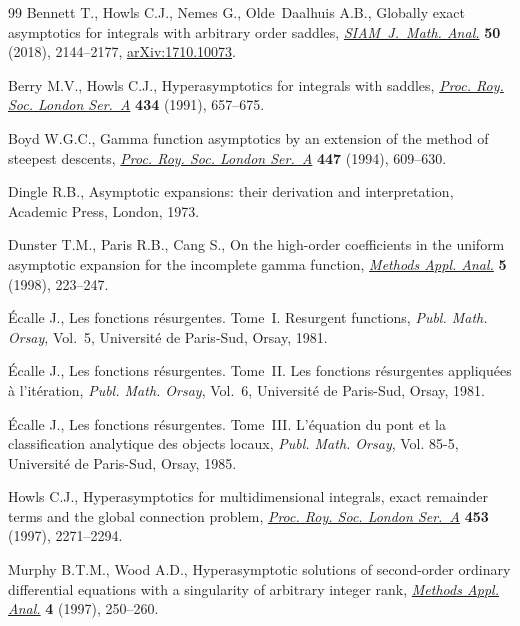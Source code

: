 \documentclass[11pt]{article}
\numberwithin{equation}{section}
\numberwithin{equation}{section}
\begin{document}
\begin{thebibliography}{99}
Bennett T., Howls C.J., Nemes G., Olde~Daalhuis A.B., Globally exact
 asymptotics for integrals with arbitrary order saddles, \href{https://doi.org/10.1137/17M1154217}{\textit{SIAM~J.~Math.
 Anal.}} \textbf{50} (2018), 2144--2177, \href{https://arxiv.org/abs/1710.10073}{arXiv:1710.10073}.

Berry M.V., Howls C.J., Hyperasymptotics for integrals with saddles,
  \href{https://doi.org/10.1098/rspa.1991.0119}{\textit{Proc. Roy. Soc. London Ser.~A}} \textbf{434} (1991), 657--675.

Boyd W.G.C., Gamma function asymptotics by an extension of the method of
 steepest descents, \href{https://doi.org/10.1098/rspa.1994.0158}{\textit{Proc. Roy. Soc. London Ser.~A}} \textbf{447}
 (1994), 609--630.

Dingle R.B., Asymptotic expansions: their derivation and interpretation,
 Academic Press, London, 1973.

Dunster T.M., Paris R.B., Cang S., On the high-order coefficients in the
 uniform asymptotic expansion for the incomplete gamma function,
  \href{https://doi.org/10.4310/MAA.1998.v5.n3.a1}{\textit{Methods Appl. Anal.}} \textbf{5} (1998), 223--247.

\'Ecalle J., Les fonctions r\'esurgentes. {T}ome~{I}. {R}esurgent functions,
 \textit{Publ. Math. Orsay}, Vol.~5, Universit\'e de Paris-Sud, Orsay, 1981.

\'Ecalle J., Les fonctions r\'esurgentes. {T}ome~{II}. {L}es fonctions
 r\'esurgentes appliqu\'ees \`a l'it\'eration, \textit{Publ. Math. Orsay},
 Vol.~6, Universit\'e de Paris-Sud, Orsay, 1981.

\'Ecalle J., Les fonctions r\'esurgentes. {T}ome~{III}. {L}'\'equation du pont
 et la classification analytique des objects locaux, \textit{Publ. Math.
 Orsay}, Vol. 85-5, Universit\'e de Paris-Sud, Orsay, 1985.

Howls C.J., Hyperasymptotics for multidimensional integrals, exact remainder
 terms and the global connection problem, \href{https://doi.org/10.1098/rspa.1997.0122}{\textit{Proc. Roy. Soc. London
 Ser.~A}} \textbf{453} (1997), 2271--2294.

Murphy B.T.M., Wood A.D., Hyperasymptotic solutions of second-order ordinary
 differential equations with a singularity of arbitrary integer rank,
 \href{https://doi.org/10.4310/MAA.1997.v4.n3.a2}{\textit{Methods Appl. Anal.}} \textbf{4} (1997), 250--260.


\end{thebibliography}
\end{document}
